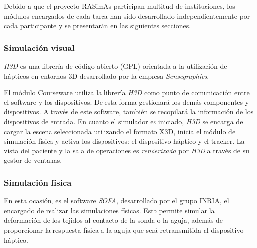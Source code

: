 
Debido a que el proyecto \ac{RASimAs} participan multitud de instituciones, los módulos encargados de cada tarea han sido desarrollado independientemente por cada participante y se presentarán en las siguientes secciones.


\subsubsection{Simulación visual}

\emph{H3D}\cite{sensegraphics2012open} es una librería de código abierto (\ac{GPL})  orientada a la utilización de hápticos en entornos 3D desarrollado por la empresa \emph{Sensegraphics}. 

El módulo \ac{Courseware} utiliza la librería \emph{H3D} como punto de comunicación entre el software y los dispositivos. De esta forma gestionará los demás componentes y dispositivos. A través de este software, también se recopilará la información de los dispositivos de entrada.
En cuanto el simulador es iniciado, \emph{H3D} se encarga de cargar la escena seleccionada utilizando el formato \ac{X3D}, inicia el módulo de simulación física y activa los dispositivos:  el dispositivo háptico y el \ac{tracker}. La vista del paciente y la sala de operaciones es \emph{renderizada} por \emph{H3D} a través de su gestor de ventanas.

\subsubsection{Simulación física}

En esta ocasión, es el software \emph{SOFA}\cite{sofaweb}, desarrollado por el grupo \ac{INRIA}, el encargado de realizar las simulaciones físicas. Esto permite simular la deformación de los tejidos al contacto de la sonda o la aguja, además de proporcionar la respuesta física a la aguja que será retransmitida al dispositivo háptico.

